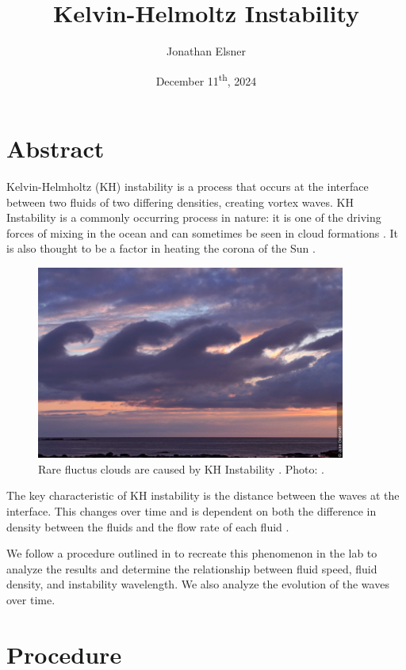 \documentclass{article}
\title{Kelvin-Helmoltz Instability}
\author{Jonathan Elsner}
\date{December 11\textsuperscript{th}, 2024}
\begin{document}
\maketitle

\section{Abstract}

Kelvin-Helmholtz (KH) instability is a process that occurs at the interface
between two fluids of two differing densities, creating vortex waves. KH
Instability is a commonly occurring process in nature: it is one of the driving
forces of mixing in the ocean \cite{woods-1968} and can sometimes be seen in
cloud formations \cite{ludlam-1967}. It is also thought to
be a factor in heating the corona of the Sun \cite{nasa-solar-surfer}.

\begin{figure}[h]
    \centering
    \includegraphics[width=4in]{kh-instability-clouds-2.jpg}
    \caption{Rare fluctus clouds are caused by KH Instability \cite{ludlam-1967}. Photo: \cite{fluctus-clouds}.}
\end{figure}

The key characteristic of KH instability is the distance between the waves at
the interface. This changes over time and is dependent on both the difference in
density between the fluids and the flow rate of each fluid \cite{kundu}.

We follow a procedure outlined in \cite{kh-instability-demo} to recreate this
phenomenon in the lab to analyze the results and determine the relationship
between fluid speed, fluid density, and instability wavelength. We also analyze
the evolution of the waves over time.

\section{Procedure}
\end{document}
